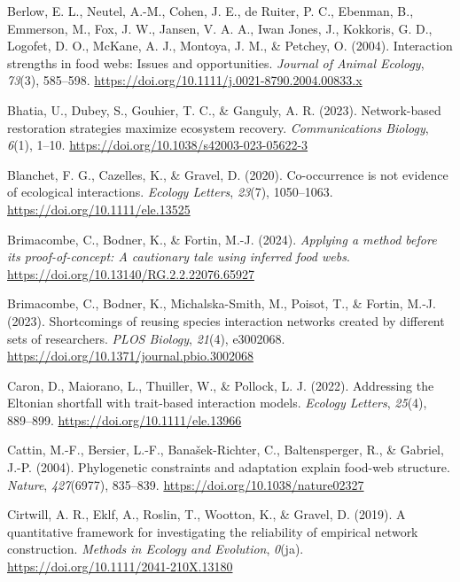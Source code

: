 \documentclass[
]{article}
\newlength{\cslhangindent}
\newenvironment{CSLReferences}[2] %
 {\begin{list}{}{%
  \setlength{\itemindent}{0pt}
  \setlength{\leftmargin}{0pt}
  \setlength{\parsep}{0pt}
  \ifodd #1
   \setlength{\leftmargin}{\cslhangindent}
   \setlength{\itemindent}{-1\cslhangindent}
  \fi
  \setlength{\itemsep}{#2\baselineskip}}}
 {\end{list}}
\begin{document}
\begin{CSLReferences}{1}{0}
Berlow, E. L., Neutel, A.-M., Cohen, J. E., de Ruiter, P. C., Ebenman,
B., Emmerson, M., Fox, J. W., Jansen, V. A. A., Iwan Jones, J.,
Kokkoris, G. D., Logofet, D. O., McKane, A. J., Montoya, J. M., \&
Petchey, O. (2004). Interaction strengths in food webs: Issues and
opportunities. \emph{Journal of Animal Ecology}, \emph{73}(3), 585--598.
\url{https://doi.org/10.1111/j.0021-8790.2004.00833.x}

Bhatia, U., Dubey, S., Gouhier, T. C., \& Ganguly, A. R. (2023).
Network-based restoration strategies maximize ecosystem recovery.
\emph{Communications Biology}, \emph{6}(1), 1--10.
\url{https://doi.org/10.1038/s42003-023-05622-3}

Blanchet, F. G., Cazelles, K., \& Gravel, D. (2020). Co-occurrence is
not evidence of ecological interactions. \emph{Ecology Letters},
\emph{23}(7), 1050--1063. \url{https://doi.org/10.1111/ele.13525}

Brimacombe, C., Bodner, K., \& Fortin, M.-J. (2024). \emph{Applying a
method before its proof-of-concept: {A} cautionary tale using inferred
food webs}. \url{https://doi.org/10.13140/RG.2.2.22076.65927}

Brimacombe, C., Bodner, K., Michalska-Smith, M., Poisot, T., \& Fortin,
M.-J. (2023). Shortcomings of reusing species interaction networks
created by different sets of researchers. \emph{PLOS Biology},
\emph{21}(4), e3002068.
\url{https://doi.org/10.1371/journal.pbio.3002068}

Caron, D., Maiorano, L., Thuiller, W., \& Pollock, L. J. (2022).
Addressing the {Eltonian} shortfall with trait-based interaction models.
\emph{Ecology Letters}, \emph{25}(4), 889--899.
\url{https://doi.org/10.1111/ele.13966}

Cattin, M.-F., Bersier, L.-F., Banašek-Richter, C., Baltensperger, R.,
\& Gabriel, J.-P. (2004). Phylogenetic constraints and adaptation
explain food-web structure. \emph{Nature}, \emph{427}(6977), 835--839.
\url{https://doi.org/10.1038/nature02327}

Cirtwill, A. R., Eklf, A., Roslin, T., Wootton, K., \& Gravel, D.
(2019). A quantitative framework for investigating the reliability of
empirical network construction. \emph{Methods in Ecology and Evolution},
\emph{0}(ja). \url{https://doi.org/10.1111/2041-210X.13180}


\end{CSLReferences}
\end{document}
